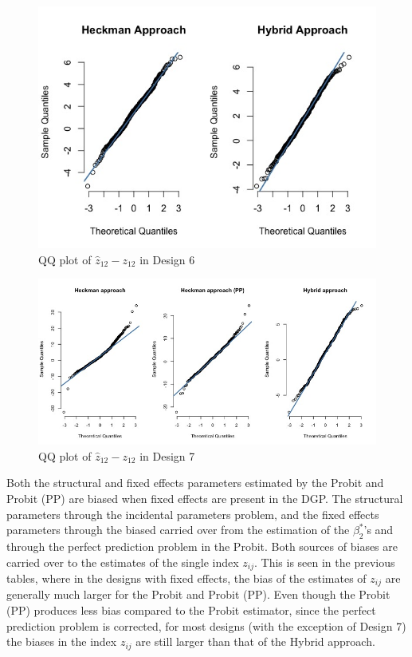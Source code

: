 \begin{figure}[htbp]
  \centerline{\includegraphics[scale=.4]{content/Figures/QQ_Zij_Design6.png}}
  \caption{\footnotesize{QQ plot of $\hat{z}_{12} - z_{12}$ in Design 6}}
  \label{QQ_Zij_Design6}
\end{figure}
\begin{figure}[htbp]
  \centerline{\includegraphics[scale=.4]{content/Figures/QQ_Zij_Design7.png}}
  \caption{\footnotesize{QQ plot of $\hat{z}_{12} - z_{12}$ in Design 7}}
  \label{QQ_Zij_Design7}
\end{figure}
\newline
Both the structural and fixed effects parameters estimated by the Probit and Probit (PP) are biased when fixed effects are present in the DGP. The structural parameters through the incidental parameters problem, and the fixed effects parameters through the biased carried over from the estimation of the $\beta_2^*$'s and through the perfect prediction problem in the Probit. Both sources of biases are carried over to the estimates of the single index $z_{ij}$. This is seen in the previous tables, where in the designs with fixed effects, the bias of the estimates of $z_{ij}$ are generally much larger for the Probit and Probit (PP). Even though the Probit (PP) produces less bias compared to the Probit estimator, since the perfect prediction problem is corrected, for most designs (with the exception of Design 7) the biases in the index $z_{ij}$ are still larger than that of the Hybrid approach.

